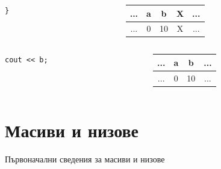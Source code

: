 \documentclass{beamer}
\begin{document}
\begin{frame}[fragile]
\begin{columns}[c]
\begin{column}{0.7\textwidth}
\begin{tabular}{ c | c | c | c | c}
\end{tabular}

  \end{column}
\end{columns}

\pause

\begin{columns}[c]
  \begin{column}{0.3\textwidth}
\begin{lstlisting}
}
\end{lstlisting}

  \end{column}
  \begin{column}{0.7\textwidth}
\begin{tabular}{ c | c | c | c | c}
\hline
... & a & b & \alert{X} &  ...\\\hline
... & 0 & 10 & \alert{X} &... \\\hline
  
\end{tabular}

  \end{column}
\end{columns}

\pause

\begin{columns}[c]
  \begin{column}{0.3\textwidth}
\begin{lstlisting}
cout << b;
\end{lstlisting}

  \end{column}
  \begin{column}{0.7\textwidth}
\begin{tabular}{ c | c | c | c}
\hline
... & a & b &  ...\\\hline
... & 0 & 10 & ... \\\hline
  
\end{tabular}

  \end{column}
\end{columns}

\end{frame}




\section{Масиви и низове} 

\begin{frame}
\centerline{Първоначални сведения за масиви и низове}
\end{frame}
\end{document}

